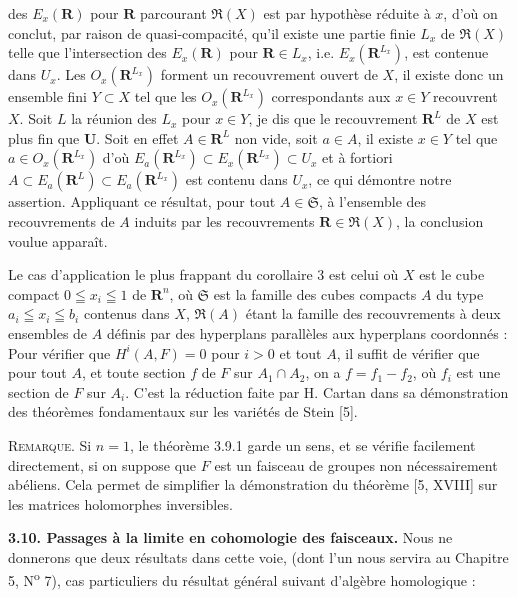 
des $E_x(\mathbf R)$ pour $\mathbf R$ parcourant $\mathfrak R(X)$ est par
hypothèse réduite à $x$, d'où on conclut, par raison de quasi-compacité,
qu'il existe une partie finie $L_x$ de $\mathfrak R(X)$ telle que
l'intersection des $E_x(\mathbf R)$ pour $\mathbf R\in L_x$, i.e.
$E_x(\mathbf R^{L_x})$, est contenue dans $U_x$. Les
$O_x(\mathbf R^{L_x})$ forment un recouvrement ouvert de $X$, il existe donc
un ensemble fini $Y\subset X$ tel que les $O_x(\mathbf R^{L_x})$
correspondants aux $x\in Y$ recouvrent $X$. Soit $L$ la réunion des $L_x$
pour $x\in Y$, je dis que le recouvrement $\mathbf R^L$ de $X$ est plus fin
que $\mathbf U$. Soit en effet $A\in\mathbf R^L$ non vide, soit $a\in A$,
il existe $x\in Y$ tel que $a\in O_x(\mathbf R^{L_x})$ d'où
$E_a(\mathbf R^{L_x})\subset E_x(\mathbf R^{L_x})\subset U_x$ et à fortiori
$A\subset E_a(\mathbf R^L)\subset E_a(\mathbf R^{L_x})$ est contenu dans
$U_x$, ce qui démontre notre assertion. Appliquant ce résultat, pour tout
$A\in\mathfrak S$, à l'ensemble des recouvrements de $A$ induits par les
recouvrements $\mathbf R\in\mathfrak R(X)$, la conclusion voulue apparaît.

Le cas d'application le plus frappant du corollaire 3 est celui où $X$ est
le cube compact $0\leqq x_i\leqq1$ de $\mathbf R^n$, où $\mathfrak S$ est la
famille des cubes compacts $A$ du type $a_i\leqq x_i\leqq b_i$ contenus dans
$X$, $\mathfrak R(A)$ étant la famille des recouvrements à deux ensembles de
$A$ définis par des hyperplans parallèles aux hyperplans coordonnés : Pour
vérifier que $H^i(A,F)=0$ pour $i>0$ et tout $A$, il suffit de vérifier que
pour tout $A$, et toute section $f$ de $F$ sur $A_1\cap A_2$, on a
$f=f_1-f_2$, où $f_i$ est une section de $F$ sur $A_i$. C'est la réduction
faite par H. Cartan dans sa démonstration des théorèmes fondamentaux sur les
variétés de Stein [5].

\textsc{Remarque.} Si $n=1$, le théorème 3.9.1 garde un sens, et se
vérifie facilement directement, si on suppose que $F$ est un faisceau de
groupes non nécessairement abéliens. Cela permet de simplifier la
démonstration du théorème [5, XVIII] sur les matrices holomorphes inversibles.

\textbf{3.10. Passages à la limite en cohomologie des faisceaux.}
Nous ne donnerons que deux résultats dans cette voie, (dont l'un nous servira
au Chapitre 5, N\textsuperscript{o} 7), cas particuliers du résultat général
suivant d'algèbre homologique :

